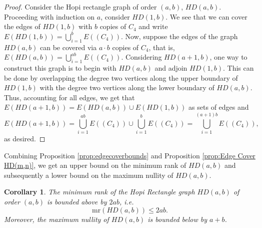 \documentclass[11pt]{article}
\theoremstyle{plain} \newtheorem{question}{Question}
\newtheorem{cor}[thm]{Corollary}
\theoremstyle{definition}
\begin{document}
\begin{proof}
	Consider the Hopi rectangle graph of order $(a,b)$, $HD(a,b)$. Proceeding with induction on $a$, consider $HD(1,b)$. We see that we can cover the edges of $HD(1,b)$ with $b$ copies of $C_4$ and write $E(HD(1,b)) = \bigcup\limits_{i=1}^{b} E((C_4))$. Now, suppose the edges of the graph $HD(a,b)$ can be covered via $a\cdot b$ copies of $C_4$, that is, $E(HD(a,b)) = \bigcup\limits_{i=1}^{ab} E((C_4))$. Considering $HD(a+1,b)$, one way to construct this graph is to begin with $HD(a,b)$ and adjoin $HD(1,b)$. This can be done by overlapping the degree two vertices along the upper boundary of $HD(1,b)$ with the degree two vertices along the lower boundary of $HD(a,b)$. Thus, accounting for all edges, we get that $E(HD(a+1,b)) =  E(HD(a,b)) \cup E(HD(1,b))$ as sets of edges and
        $$E(HD(a+1,b)) = \bigcup\limits_{i=1}^{ab} E((C_4)) \cup \bigcup\limits_{i=1}^{b} E((C_4)) = \bigcup\limits_{i=1}^{(a+1)b} E((C_4)),$$ 
    as desired.
\end{proof}



Combining Proposition \ref{prop:edgecoverbounds} and Proposition \ref{prop:Edge Cover HD(m,n)}, we get an upper bound on the minimum rank of $HD(a,b)$ and subsequently a lower bound on the maximum nullity of $HD(a,b)$. 



\begin{cor}\label{cor:Min Rank HD(m,n)}
    The minimum rank of the Hopi Rectangle graph $HD(a,b)$ of order $(a,b)$ is bounded above by $2ab$, i.e. $$\text{mr}(HD(a,b))\leq 2ab.$$
Moreover, the maximum nullity of $HD(a,b)$ is bounded below by $a+b$. 
\end{cor}

\end{document}
